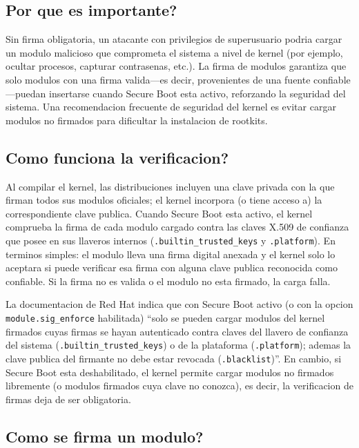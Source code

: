 \subsection*{Por que es importante?}

Sin firma obligatoria, un atacante con privilegios de superusuario podria cargar un modulo malicioso que comprometa el sistema a nivel de kernel (por ejemplo, ocultar procesos, capturar contrasenas, etc.). La firma de modulos garantiza que solo modulos con una firma valida—es decir, provenientes de una fuente confiable—puedan insertarse cuando Secure Boot esta activo, reforzando la seguridad del sistema. Una recomendacion frecuente de seguridad del kernel es evitar cargar modulos no firmados para dificultar la instalacion de rootkits.

\subsection*{Como funciona la verificacion?}

Al compilar el kernel, las distribuciones incluyen una clave privada con la que firman todos sus modulos oficiales; el kernel incorpora (o tiene acceso a) la correspondiente clave publica. Cuando Secure Boot esta activo, el kernel comprueba la firma de cada modulo cargado contra las claves X.509 de confianza que posee en sus llaveros internos (\texttt{.builtin\_trusted\_keys} y \texttt{.platform}). En terminos simples: el modulo lleva una firma digital anexada y el kernel solo lo aceptara si puede verificar esa firma con alguna clave publica reconocida como confiable. Si la firma no es valida o el modulo no esta firmado, la carga falla.

La documentacion de Red Hat indica que con Secure Boot activo (o con la opcion \texttt{module.sig\_enforce} habilitada) ``solo se pueden cargar modulos del kernel firmados cuyas firmas se hayan autenticado contra claves del llavero de confianza del sistema (\texttt{.builtin\_trusted\_keys}) o de la plataforma (\texttt{.platform}); ademas la clave publica del firmante no debe estar revocada (\texttt{.blacklist})''. En cambio, si Secure Boot esta deshabilitado, el kernel permite cargar modulos no firmados libremente (o modulos firmados cuya clave no conozca), es decir, la verificacion de firmas deja de ser obligatoria.

\subsection*{Como se firma un modulo?}

